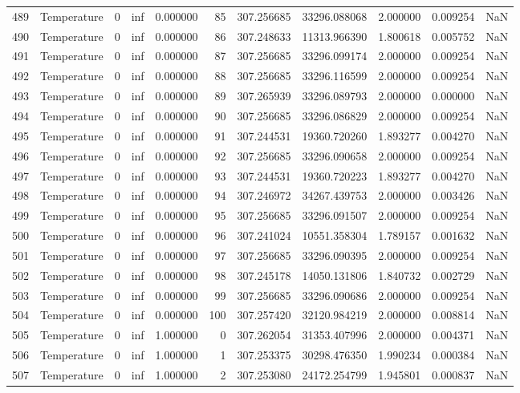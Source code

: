 \begin{tabular}{llrrrrrrrrr}
489 & Temperature & 0 & inf & 0.000000 & 85 & 307.256685 & 33296.088068 & 2.000000 & 0.009254 & NaN \\
490 & Temperature & 0 & inf & 0.000000 & 86 & 307.248633 & 11313.966390 & 1.800618 & 0.005752 & NaN \\
491 & Temperature & 0 & inf & 0.000000 & 87 & 307.256685 & 33296.099174 & 2.000000 & 0.009254 & NaN \\
492 & Temperature & 0 & inf & 0.000000 & 88 & 307.256685 & 33296.116599 & 2.000000 & 0.009254 & NaN \\
493 & Temperature & 0 & inf & 0.000000 & 89 & 307.265939 & 33296.089793 & 2.000000 & 0.000000 & NaN \\
494 & Temperature & 0 & inf & 0.000000 & 90 & 307.256685 & 33296.086829 & 2.000000 & 0.009254 & NaN \\
495 & Temperature & 0 & inf & 0.000000 & 91 & 307.244531 & 19360.720260 & 1.893277 & 0.004270 & NaN \\
496 & Temperature & 0 & inf & 0.000000 & 92 & 307.256685 & 33296.090658 & 2.000000 & 0.009254 & NaN \\
497 & Temperature & 0 & inf & 0.000000 & 93 & 307.244531 & 19360.720223 & 1.893277 & 0.004270 & NaN \\
498 & Temperature & 0 & inf & 0.000000 & 94 & 307.246972 & 34267.439753 & 2.000000 & 0.003426 & NaN \\
499 & Temperature & 0 & inf & 0.000000 & 95 & 307.256685 & 33296.091507 & 2.000000 & 0.009254 & NaN \\
500 & Temperature & 0 & inf & 0.000000 & 96 & 307.241024 & 10551.358304 & 1.789157 & 0.001632 & NaN \\
501 & Temperature & 0 & inf & 0.000000 & 97 & 307.256685 & 33296.090395 & 2.000000 & 0.009254 & NaN \\
502 & Temperature & 0 & inf & 0.000000 & 98 & 307.245178 & 14050.131806 & 1.840732 & 0.002729 & NaN \\
503 & Temperature & 0 & inf & 0.000000 & 99 & 307.256685 & 33296.090686 & 2.000000 & 0.009254 & NaN \\
504 & Temperature & 0 & inf & 0.000000 & 100 & 307.257420 & 32120.984219 & 2.000000 & 0.008814 & NaN \\
505 & Temperature & 0 & inf & 1.000000 & 0 & 307.262054 & 31353.407996 & 2.000000 & 0.004371 & NaN \\
506 & Temperature & 0 & inf & 1.000000 & 1 & 307.253375 & 30298.476350 & 1.990234 & 0.000384 & NaN \\
507 & Temperature & 0 & inf & 1.000000 & 2 & 307.253080 & 24172.254799 & 1.945801 & 0.000837 & NaN \\

\end{tabular}
